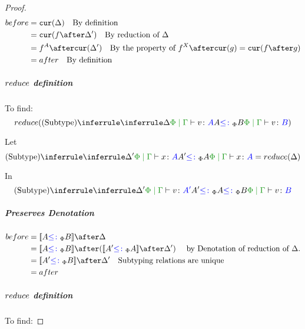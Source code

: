 \documentclass{report}
\begin{document}
\begin{framed}
\begin{proof}
                        \begin{align*}
                            before & = \cur{\D} \qt{By definition}\\
                                    & = \cur{f\after\D'} \qt{By reduction of $\D$} \\
                                    & = f^A\after\cur{\D'}\qt{By the property of $f^X\after\cur{g} = \cur{f\after g}$} \\
                                    & = after \qt{By definition}\\
                        \end{align*}
        
                    \case{\vsubtype}
                    \subparagraph{$reduce$ definition}
                    To find:
                    \begin{equation}
                        \reduce(\ntreeruleII{\vsubtype}{\treeruleI{\D}{\gpetyperelation{v}{A}}}{ A \subtypep B}{\gpetyperelation{v}{B}})
                    \end{equation}
        
                    Let 
                    \begin{equation}\label{SubtypeDeltaReduction}
                        \ntreeruleII{\vsubtype}{\treeruleI{\D'}{\gpetyperelation{x}{A}}}{ A'\subtypep A}{\gpetyperelation{x}{A}} = \reduce(\D)
                    \end{equation}
        
                    In 
                    \begin{equation}
                        \ntreeruleII{\vsubtype}{
                            \treeruleI{\D'}{\gpetyperelation{v}{A'}}
                        }{
                        A' \subtypep A \subtypep B
                        }{\gpetyperelation{v}{B}}
                    \end{equation}
        
                    \subparagraph{Preserves Denotation}
                        \begin{align*}
                            before & = \deno{A \subtypep B} \after \D \\
                            & = \deno{A \subtypep B} \after (\deno{A' \subtypep A} \after \D') \qt{ by Denotation of reduction of $\D$.}\\
                            & = \deno{A' \subtypep B} \after \D'\qt{Subtyping relations are unique} \\
                            & = after \\
                        \end{align*}
                    \case{\vreturn}
                    \subparagraph{$reduce$ definition}
                    To find:
                    

\end{proof}
\end{framed}
\end{document}

